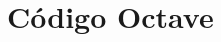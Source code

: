 \documentclass[12pt,letterpaper]{article}
\begin{document}
% 
% 
% 
% 
% 
% 
% 
% 
% 
% 
% 
% 

\appendix
\section{Código Octave}

\end{document}
